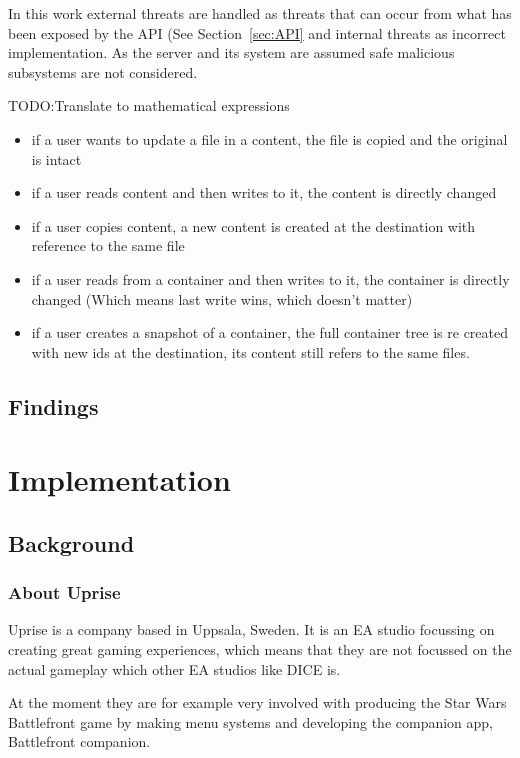 \documentclass[a4paper,12pt]{article}
\newcommand{\fix}{\colorbox{yellow!30}{TODO:}}
\begin{document}
In this work external threats are handled as threats that can occur from what has been exposed by
the API (See Section~\ref{sec:API} and internal threats as incorrect implementation. As the server
and its system are assumed safe malicious subsystems are not considered.


\fix Translate to mathematical expressions

\begin{itemize}
    \item if a user wants to update a file in a content, the file is copied and the original is intact
    \item if a user reads content and then writes to it, the content is directly changed
    \item if a user copies content, a new content is created at the destination with reference to the same
          file
    \item if a user reads from a container and then writes to it, the container is directly changed
          (Which means last write wins, which doesn't matter)
    \item if a user creates a snapshot of a container, the full container tree is re created with 
          new ids at the destination, its content still refers to the same files.
\end{itemize}

\subsection{Findings}

\newpage
\section{Implementation}
\subsection{Background}
\subsubsection{About Uprise}
Uprise is a company based in Uppsala, Sweden. It is an EA studio focussing on creating great gaming
experiences, which means that they are not focussed on the actual gameplay which other EA studios
like DICE is. 

At the moment they are for example very involved with producing the Star Wars Battlefront game by
making menu systems and developing the companion app, Battlefront companion.
\end{document}
